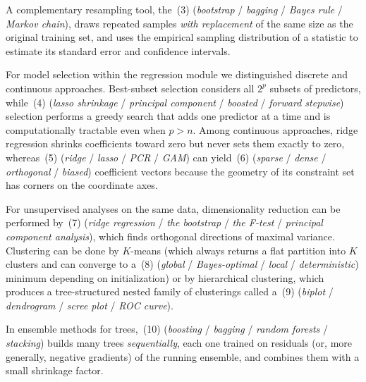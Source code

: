 \documentclass[11pt,a4paper]{article}
\begin{document}
A complementary resampling tool, the \underline{\hspace{2cm}}\,(3) (\emph{bootstrap} / \emph{bagging} / \emph{Bayes rule} / \emph{Markov chain}), draws repeated samples \emph{with replacement} of the same size as the original training set, and uses the empirical sampling distribution of a statistic to estimate its standard error and confidence intervals.

For model selection within the regression module we distinguished discrete and continuous approaches. Best-subset selection considers all $2^p$ subsets of predictors, while \underline{\hspace{2cm}}\,(4) (\emph{lasso shrinkage} / \emph{principal component} / \emph{boosted} / \emph{forward stepwise}) selection performs a greedy search that adds one predictor at a time and is computationally tractable even when $p > n$. Among continuous approaches, ridge regression shrinks coefficients toward zero but never sets them exactly to zero, whereas \underline{\hspace{2cm}}\,(5) (\emph{ridge} / \emph{lasso} / \emph{PCR} / \emph{GAM}) can yield \underline{\hspace{2cm}}\,(6) (\emph{sparse} / \emph{dense} / \emph{orthogonal} / \emph{biased}) coefficient vectors because the geometry of its constraint set has corners on the coordinate axes.

For unsupervised analyses on the same data, dimensionality reduction can be performed by \underline{\hspace{2cm}}\,(7) (\emph{ridge regression} / \emph{the bootstrap} / \emph{the F-test} / \emph{principal component analysis}), which finds orthogonal directions of maximal variance. Clustering can be done by $K$-means (which always returns a flat partition into $K$ clusters and can converge to a \underline{\hspace{2cm}}\,(8) (\emph{global} / \emph{Bayes-optimal} / \emph{local} / \emph{deterministic}) minimum depending on initialization) or by hierarchical clustering, which produces a tree-structured nested family of clusterings called a \underline{\hspace{2cm}}\,(9) (\emph{biplot} / \emph{dendrogram} / \emph{scree plot} / \emph{ROC curve}).

In ensemble methods for trees, \underline{\hspace{2cm}}\,(10) (\emph{boosting} / \emph{bagging} / \emph{random forests} / \emph{stacking}) builds many trees \emph{sequentially}, each one trained on residuals (or, more generally, negative gradients) of the running ensemble, and combines them with a small shrinkage factor.
\end{document}

